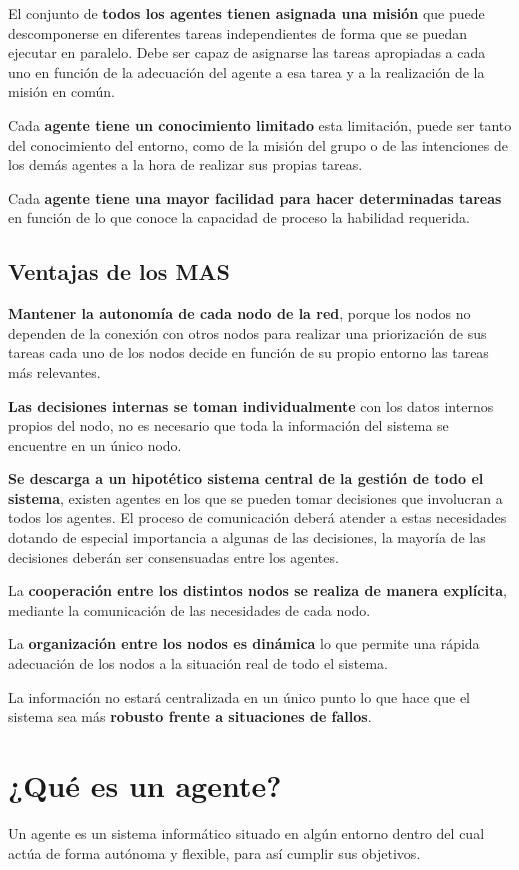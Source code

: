 \documentclass[12pt, twoside, openright]{report} %
\begin{document}
El conjunto de \textbf{todos los agentes tienen asignada una misión} que puede descomponerse en diferentes tareas independientes de forma que se puedan ejecutar en paralelo. Debe ser capaz de asignarse las tareas apropiadas a cada uno en función de la adecuación del agente a esa tarea y a la realización de la misión en común.

Cada \textbf{agente tiene un conocimiento limitado} esta limitación, puede ser tanto del conocimiento del entorno, como de la misión del grupo o de las intenciones de los demás agentes a la hora de realizar sus propias tareas.

Cada \textbf{agente tiene una mayor facilidad para hacer determinadas tareas} en función de lo que conoce la capacidad de proceso la habilidad requerida.

\subsection{Ventajas de los MAS}
\textbf{Mantener la autonomía de cada nodo de la red}, porque los nodos no dependen de la conexión con otros nodos para realizar una priorización de sus tareas cada uno de los nodos decide en función de su propio entorno las tareas más relevantes.

\textbf{Las decisiones internas se toman individualmente} con los datos internos propios del nodo, no es necesario que toda la información del sistema se encuentre en un único nodo.

\textbf{Se descarga a un hipotético sistema central de la gestión de todo el sistema}, existen agentes en los que se pueden tomar decisiones que involucran a todos los agentes. El proceso de comunicación deberá atender a estas necesidades dotando de especial importancia a algunas de las decisiones, la mayoría de las decisiones deberán ser consensuadas entre los agentes.

La \textbf{cooperación entre los distintos nodos se realiza de manera explícita}, mediante la comunicación de las necesidades de cada nodo.

La \textbf{organización entre los nodos es dinámica} lo que permite una rápida adecuación de los nodos a la situación real de todo el sistema.

La información no estará centralizada en un único punto lo que hace que el sistema sea más \textbf{robusto frente a situaciones de fallos}.

\section{¿Qué es un agente?}
Un agente es un sistema informático situado en algún entorno dentro del cual actúa de forma autónoma y flexible, para así cumplir sus objetivos.
\end{document}
